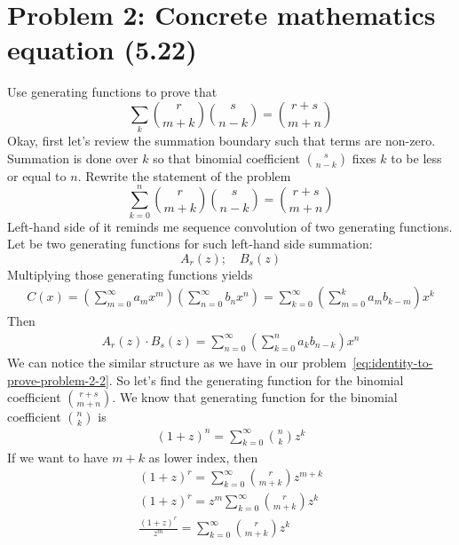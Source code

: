 ﻿\section{Problem 2: Concrete mathematics equation (5.22)}
\label{sec:problem-2:-concrete-mathematics-equation-(5.22)}
Use generating functions to prove that
\begin{equation}
    \sum_{k} \binom{r}{m+k} \binom{s}{n-k} = \binom{r+s}{m+n}
    \label{eq:identity-to-prove-problem-2}
\end{equation}
Okay, first let's review the summation boundary such that terms are non-zero.
Summation is done over $k$ so that binomial coefficient $\binom{s}{n-k}$ fixes $k$ to be less or equal to $n$.
Rewrite the statement of the problem
\begin{equation}
    \sum_{k=0}^{n} \binom{r}{m+k} \binom{s}{n-k} = \binom{r+s}{m+n}
    \label{eq:identity-to-prove-problem-2-2}
\end{equation}
Left-hand side of it reminds me sequence convolution of two generating functions.
Let be two generating functions for such left-hand side summation:
\begin{equation*}
    A_r(z); \quad B_s(z)
\end{equation*}
Multiplying those generating functions yields
\begin{align*}
    C(x) = \left(\sum_{m=0}^{\infty} a_m x^m\right) \left(\sum_{n=0}^{\infty} b_n x^n\right) = \sum_{k=0}^{\infty} \left( \sum_{m=0}^{k} a_m b_{k-m} \right) x^k
\end{align*}
Then
\begin{align*}
    A_r(z) \cdot B_s(z) = \sum_{n=0}^{\infty} \left( \sum_{k=0}^{n} a_k b_{n-k} \right) x^n
\end{align*}
We can notice the similar structure as we have in our problem~\eqref{eq:identity-to-prove-problem-2-2}.
So let's find the generating function for the binomial coefficient $\binom{r+s}{m+n}$.
We know that generating function for the binomial coefficient $\binom{n}{k}$ is
\begin{align*}
(1+z)
    ^{n} = \sum_{k=0}^{\infty} \binom{n}{k} z^k
\end{align*}
If we want to have $m+k$ as lower index, then
\begin{align*}
(1+z)
    ^{r} = \sum_{k=0}^{\infty} \binom{r}{m+k} z^{m+k} \\
    (1+z)^{r} = z^m \sum_{k=0}^{\infty} \binom{r}{m+k} z^{k} \\
    \frac{(1+z)^{r}}{z^m} = \sum_{k=0}^{\infty} \binom{r}{m+k} z^{k}
\end{align*}
